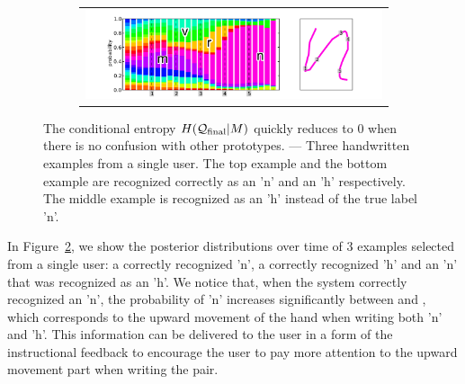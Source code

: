 \documentclass{sigchi}
\begin{document}
\begin{figure}
\begin{subfigure}[b]{0.45\textwidth}
\begin{tabular}{c}
      \includegraphics[width=\textwidth]{figures/best_l2.pdf}
    \end{tabular}
    \caption{}
    \label{fig:confusion}
  \end{subfigure}
  \caption{The conditional entropy $H(\mathcal{Q}_{\mathrm{final}} | M)$ quickly reduces to 0
    when there is no confusion with other prototypes.  --- Three
    handwritten examples from a single user. The top example and the
    bottom example are recognized correctly as an 'n' and an 'h'
    respectively. The middle example is recognized as an 'h' instead
    of the true label 'n'.}
\end{figure}

In Figure~\ref{fig:confusion}, we show the posterior distributions
over time of 3 examples selected from a single user: a correctly
recognized 'n', a correctly recognized 'h' and an 'n' that was
recognized as an 'h'. We notice that, when the system correctly
recognized an 'n', the probability of 'n' increases significantly
between  and , which corresponds to the upward
movement of the hand when writing both 'n' and 'h'. This information
can be delivered to the user in a form of the instructional feedback
to encourage the user to pay more attention to the upward movement part
when writing the pair.
\end{document}
